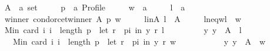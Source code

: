 \begin{isabellebody}
\ \ \ \ A\ {\isacharcolon}{\kern0pt}{\isacharcolon}{\kern0pt}\ {\isachardoublequoteopen}{\isacharprime}{\kern0pt}a\ set{\isachardoublequoteclose}\ \isanewline
\ \ \ \ p\ {\isacharcolon}{\kern0pt}{\isacharcolon}{\kern0pt}\ {\isachardoublequoteopen}{\isacharprime}{\kern0pt}a\ Profile{\isachardoublequoteclose}\ \isanewline
\ \ \ \ w\ {\isacharcolon}{\kern0pt}{\isacharcolon}{\kern0pt}\ {\isachardoublequoteopen}{\isacharprime}{\kern0pt}a{\isachardoublequoteclose}\ \isanewline
\ \ \ \ l\ {\isacharcolon}{\kern0pt}{\isacharcolon}{\kern0pt}\ {\isachardoublequoteopen}{\isacharprime}{\kern0pt}a{\isachardoublequoteclose}\isanewline
\ \ \isamarkupfalse%
\isanewline
\ \ \ \ winner{\isacharcolon}{\kern0pt}\ {\isachardoublequoteopen}condorcet{\isacharunderscore}{\kern0pt}winner\ A\ p\ w{\isachardoublequoteclose}\ \isanewline
\ \ \ \ l{\isacharunderscore}{\kern0pt}in{\isacharunderscore}{\kern0pt}A{\isacharcolon}{\kern0pt}\ {\isachardoublequoteopen}l\ {\isasymin}\ A{\isachardoublequoteclose}\ \isanewline
\ \ \ \ l{\isacharunderscore}{\kern0pt}neq{\isacharunderscore}{\kern0pt}w{\isacharcolon}{\kern0pt}{\isachardoublequoteopen}l\ {\isasymnoteq}\ w{\isachardoublequoteclose}\isanewline
\ \ \isamarkupfalse%
\isanewline
\ \ \ \ {\isachardoublequoteopen}Min\ {\isacharbraceleft}{\kern0pt}card\ {\isacharbraceleft}{\kern0pt}i{\isachardot}{\kern0pt}\ i\ {\isacharless}{\kern0pt}\ length\ p\ {\isasymand}\ {\isacharparenleft}{\kern0pt}let\ r\ {\isacharequal}{\kern0pt}\ {\isacharparenleft}{\kern0pt}p{\isacharbang}{\kern0pt}i{\isacharparenright}{\kern0pt}\ in\ {\isacharparenleft}{\kern0pt}y\ {\isasympreceq}\isactrlsub r\ l{\isacharparenright}{\kern0pt}{\isacharparenright}{\kern0pt}{\isacharbraceright}{\kern0pt}\ {\isacharbar}{\kern0pt}\isanewline
\ \ \ \ \ \ \ \ y{\isachardot}{\kern0pt}\ y\ {\isasymin}\ A\ {\isacharminus}{\kern0pt}\ {\isacharbraceleft}{\kern0pt}l{\isacharbraceright}{\kern0pt}{\isacharbraceright}{\kern0pt}\ {\isacharless}{\kern0pt}\isanewline
\ \ \ \ \ \ Min\ {\isacharbraceleft}{\kern0pt}card\ {\isacharbraceleft}{\kern0pt}i{\isachardot}{\kern0pt}\ i\ {\isacharless}{\kern0pt}\ length\ p\ {\isasymand}\ {\isacharparenleft}{\kern0pt}let\ r\ {\isacharequal}{\kern0pt}\ {\isacharparenleft}{\kern0pt}p{\isacharbang}{\kern0pt}i{\isacharparenright}{\kern0pt}\ in\ {\isacharparenleft}{\kern0pt}y\ {\isasympreceq}\isactrlsub r\ w{\isacharparenright}{\kern0pt}{\isacharparenright}{\kern0pt}{\isacharbraceright}{\kern0pt}\ {\isacharbar}{\kern0pt}\isanewline
\ \ \ \ \ \ \ \ \ \ y{\isachardot}{\kern0pt}\ y\ {\isasymin}\ A\ {\isacharminus}{\kern0pt}\ {\isacharbraceleft}{\kern0pt}w{\isacharbraceright}{\kern0pt}{\isacharbraceright}{\kern0pt}{\isachardoublequoteclose}\isanewline

\end{isabellebody}
